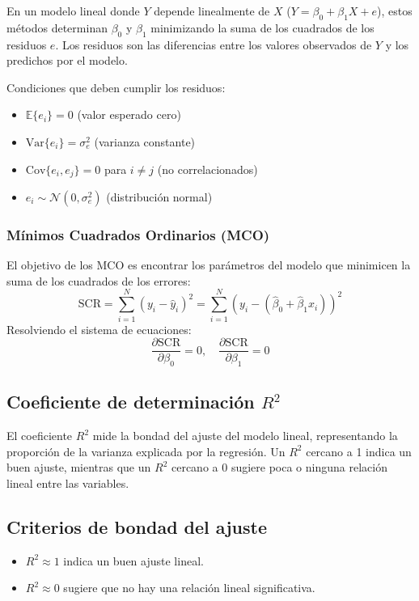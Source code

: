 En un modelo lineal donde \( Y \) depende linealmente de \( X \) (\( Y = \beta_0 + \beta_1X + e \)), estos métodos determinan \( \beta_0 \) y \( \beta_1 \) minimizando la suma de los cuadrados de los residuos \( e \). Los residuos son las diferencias entre los valores observados de \( Y \) y los predichos por el modelo. 

Condiciones que deben cumplir los residuos:
\begin{itemize}
    \item \( \mathbb{E}\{e_i\} = 0 \) (valor esperado cero)
    \item \( \text{Var}\{e_i\} = \sigma_e^2 \) (varianza constante)
    \item \( \text{Cov}\{e_i, e_j\} = 0 \) para \( i \neq j \) (no correlacionados)
    \item \( e_i \sim \mathcal{N}(0, \sigma_e^2) \) (distribución normal)
\end{itemize}

\subsubsection{Mínimos Cuadrados Ordinarios (MCO)}
El objetivo de los MCO es encontrar los parámetros del modelo que minimicen la suma de los cuadrados de los errores:
\[ \text{SCR} = \sum_{i=1}^{N} (y_i - \hat{y}_i)^2 = \sum_{i=1}^{N} \left( y_i - (\hat{\beta}_0 + \hat{\beta}_1 x_i) \right)^2 \]
Resolviendo el sistema de ecuaciones:
\[ \frac{\partial \text{SCR}}{\partial \beta_0} = 0, \quad \frac{\partial \text{SCR}}{\partial \beta_1} = 0 \]

\subsection*{Coeficiente de determinación \( R^2 \)}
El coeficiente \( R^2 \) mide la bondad del ajuste del modelo lineal, representando la proporción de la varianza explicada por la regresión. Un \( R^2 \) cercano a 1 indica un buen ajuste, mientras que un \( R^2 \) cercano a 0 sugiere poca o ninguna relación lineal entre las variables.

\subsection*{Criterios de bondad del ajuste}
\begin{itemize}
    \item \( R^2 \approx 1 \) indica un buen ajuste lineal.
    \item \( R^2 \approx 0 \) sugiere que no hay una relación lineal significativa.
\end{itemize}

